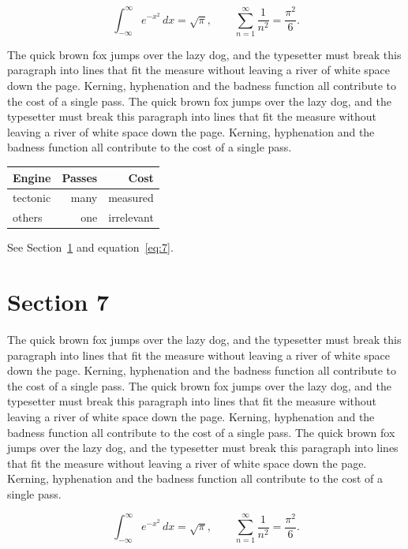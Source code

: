 \documentclass{article}
\begin{document}
\begin{equation}\label{eq:6}
\int_{-\infty}^{\infty} e^{-x^{2}}\,dx = \sqrt{\pi}, \qquad
\sum_{n=1}^{\infty} \frac{1}{n^{2}} = \frac{\pi^{2}}{6}.
\end{equation}

The quick brown fox jumps over the lazy dog, and the typesetter must break this paragraph into lines that fit the measure without leaving a river of white space down the page. Kerning, hyphenation and the badness function all contribute to the cost of a single pass. The quick brown fox jumps over the lazy dog, and the typesetter must break this paragraph into lines that fit the measure without leaving a river of white space down the page. Kerning, hyphenation and the badness function all contribute to the cost of a single pass. 

\begin{center}
\begin{tabular}{lrr}
\toprule
Engine & Passes & Cost \\
\midrule
tectonic & many & measured \\
others & one & irrelevant \\
\bottomrule
\end{tabular}
\end{center}

See Section~\ref{sec:7} and equation~\eqref{eq:7}.
\section{Section 7}
\label{sec:7}
The quick brown fox jumps over the lazy dog, and the typesetter must break this paragraph into lines that fit the measure without leaving a river of white space down the page. Kerning, hyphenation and the badness function all contribute to the cost of a single pass. The quick brown fox jumps over the lazy dog, and the typesetter must break this paragraph into lines that fit the measure without leaving a river of white space down the page. Kerning, hyphenation and the badness function all contribute to the cost of a single pass. The quick brown fox jumps over the lazy dog, and the typesetter must break this paragraph into lines that fit the measure without leaving a river of white space down the page. Kerning, hyphenation and the badness function all contribute to the cost of a single pass. 

\begin{equation}\label{eq:7}
\int_{-\infty}^{\infty} e^{-x^{2}}\,dx = \sqrt{\pi}, \qquad
\sum_{n=1}^{\infty} \frac{1}{n^{2}} = \frac{\pi^{2}}{6}.
\end{equation}
\end{document}
